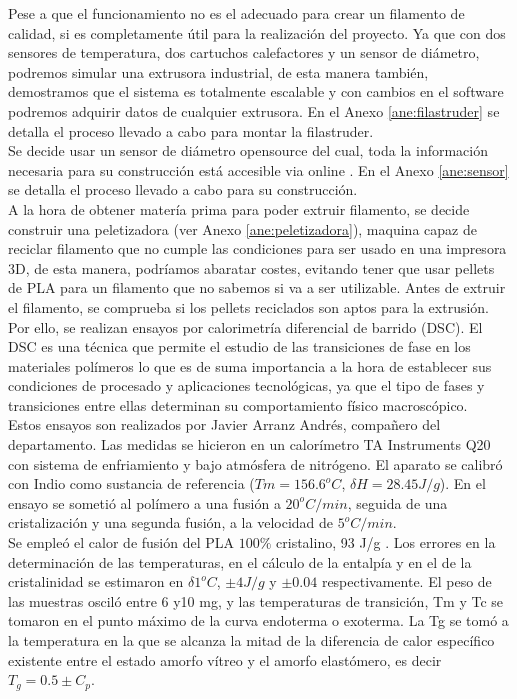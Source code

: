 Pese a que el funcionamiento no es el adecuado para crear un filamento de calidad, si es completamente útil para la realización del proyecto. Ya que con dos sensores de temperatura, dos cartuchos calefactores y un sensor de diámetro, podremos simular una extrusora industrial, de esta manera también, demostramos que el sistema es totalmente escalable y con cambios en el software podremos adquirir datos de cualquier extrusora. En el Anexo \ref{ane:filastruder} se detalla el proceso llevado a cabo para montar la filastruder.\\

Se decide usar un sensor de diámetro opensource del cual, toda la información necesaria para su construcción está accesible via online \cite{thing_filamento}. En el Anexo \ref{ane:sensor} se detalla el proceso llevado a cabo para su construcción.\\

A la hora de obtener matería prima para poder extruir filamento, se decide construir una peletizadora (ver Anexo \ref{ane:peletizadora}), maquina capaz de reciclar filamento que no cumple las condiciones para ser usado en una impresora 3D, de esta manera, podríamos abaratar costes, evitando tener que usar pellets de PLA para un filamento que no sabemos si va a ser utilizable. Antes de extruir el filamento, se comprueba si los pellets reciclados son aptos para la extrusión.\\

Por ello, se realizan ensayos por calorimetría diferencial de barrido (DSC). El DSC es una técnica que permite el estudio de las transiciones de fase en los materiales polímeros \cite{DSC1} lo que es de suma importancia a la hora de establecer sus condiciones de procesado y aplicaciones tecnológicas, ya que el tipo de fases y transiciones entre ellas determinan su comportamiento físico macroscópico.\\

Estos ensayos son realizados por Javier Arranz Andrés, compañero del departamento. Las medidas se hicieron en un calorímetro TA Instruments Q20 con sistema de enfriamiento y bajo atmósfera de nitrógeno. El aparato se calibró con Indio como sustancia de referencia ($Tm = 156.6 ^o C$, $\delta H = 28.45 J/g$). En el ensayo se sometió al polímero a una fusión a $20 ^o C/min$, seguida de una cristalización y una segunda fusión, a la velocidad de $5 ^o C/min$.\\

Se empleó el calor de fusión del PLA $100\%$ cristalino, 93 J/g \cite{DSC}. Los errores en la determinación de las temperaturas, en el cálculo de la entalpía y en el de la cristalinidad se estimaron en $\delta1 ^o C$, $\pm4 J/g$ y $\pm0.04$ respectivamente. El peso de las muestras osciló entre 6 y10 mg, y las temperaturas de transición, Tm y Tc se tomaron en el punto máximo de la curva endoterma o exoterma. La Tg se tomó a la temperatura en la que se alcanza la mitad de la diferencia de calor específico existente entre el estado amorfo vítreo y el amorfo elastómero, es decir $T_{g} = 0.5 \pm C_{p}$.\\

